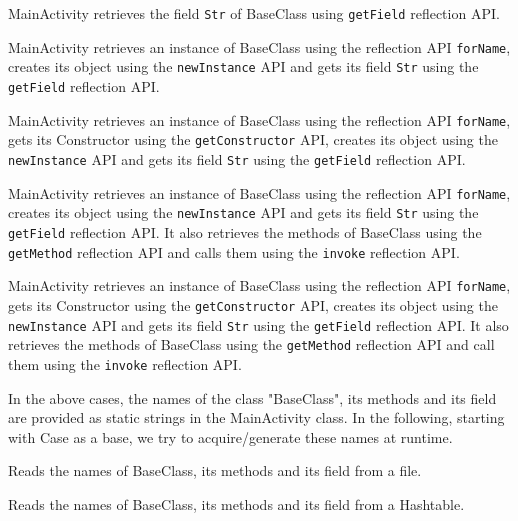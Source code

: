 \begin{description}[style=unboxed,leftmargin=0cm]

\item {} MainActivity retrieves the  field \texttt{Str} of BaseClass using \texttt{getField} reflection API. %

\item {} MainActivity retrieves an instance of BaseClass using the reflection API \texttt{forName}, creates its object using the \texttt{newInstance} API and gets its field \texttt{Str} using the \texttt{getField} reflection API. %


\item {} MainActivity retrieves an instance of BaseClass using the reflection API \texttt{forName}, gets its Constructor using the \texttt{getConstructor} API, creates its object using the \texttt{newInstance} API and gets its field \texttt{Str} using the \texttt{getField} reflection API. %

\item {} MainActivity retrieves an instance of BaseClass using the reflection API \texttt{forName}, creates its object using the \texttt{newInstance} API and gets its field \texttt{Str} using the \texttt{getField} reflection API. It also retrieves the methods of BaseClass using the \texttt{getMethod} reflection API and calls them using the \texttt{invoke} reflection API. %

\item {} MainActivity retrieves an instance of BaseClass using the reflection API \texttt{forName}, gets its Constructor using the \texttt{getConstructor} API, creates its object using the \texttt{newInstance} API and gets its field \texttt{Str} using the \texttt{getField} reflection API. It also retrieves the methods of BaseClass using the \texttt{getMethod} reflection API and call them using the \texttt{invoke} reflection API. %

In the above cases, the names of the class "BaseClass", its methods and its field are provided as static strings in the MainActivity class. In the following, starting with Case  as a base, we try to acquire/generate these names at runtime.

\item {} Reads the names of BaseClass, its methods and its field from a file. %

\item {} Reads the names of BaseClass, its methods and its field from a Hashtable.


\end{description}
